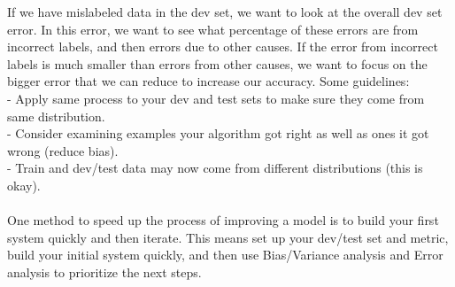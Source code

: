 \documentclass[11pt, a4paper]{article}
\begin{document}
\begin{spacing}{1.1}
	\noindent If we have mislabeled data in the dev set, we want to look at the overall dev set error. In this error, we want to see what percentage of these errors are from incorrect labels, and then errors due to other causes. If the error from incorrect labels is much smaller than errors from other causes, we want to focus on the bigger error that we can reduce to increase our accuracy. Some guidelines: \vspace*{.5mm} \\
	\hspace*{3mm} - Apply same process to your dev and test sets to make sure they come from same distribution. \\
	\hspace*{3mm} - Consider examining examples your algorithm got right as well as ones it got wrong (reduce bias). \\
	\hspace*{3mm} - Train and dev/test data may now come from different distributions (this is okay). \\~\\
	One method to speed up the process of improving a model is to build your first system quickly and then iterate. This means set up your dev/test set and metric, build your initial system quickly, and then use Bias/Variance analysis and Error analysis to prioritize the next steps. 	

\end{spacing}
\end{document}
